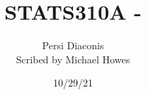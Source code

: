 




\title{STATS310A - }
\author{Persi Diaconis\\ Scribed by Michael Howes}
\date{10/29/21}

\pagestyle{fancy}
\fancyhf{}


\maketitle
\tableofcontents
